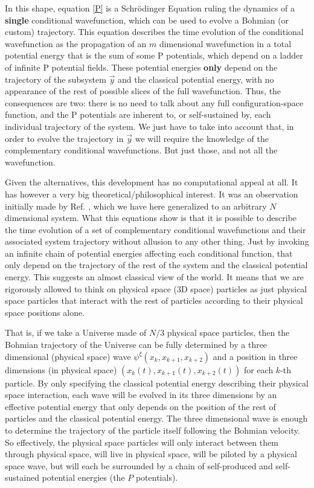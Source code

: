 \documentclass[11pt, a4paper]{article} %
\begin{document}
In this shape, equation \eqref{P} is a Schrödinger Equation ruling the dynamics of a {\bf single} conditional wavefunction, which can be used to evolve a Bohmian (or custom) trajectory. This equation describes the time evolution of the conditional wavefunction as the propagation of an $m$ dimensional wavefunction in a total potential energy that is the sum of some P potentials, which depend on a ladder of infinite P potential fields. These potential energies {\bf only} depend on the trajectory of the subsystem $\vec{y}$ and the classical potential energy, with no appearance of the rest of possible slices of the full wavefunction. Thus, the consequences are two: there is no need to talk about any full configuration-space function, and the P potentials are inherent to, or self-sustained by, each individual trajectory of the system. We just have to take into account that, in order to evolve the trajectory in $\vec{y}$ we will require the knowledge of the complementary conditional wavefunctions. But just those, and not all the wavefunction.

Given the alternatives, this development has no computational appeal at all. It has however a very big theoretical/philosophical interest. It was an observation initially made by Ref. \cite{Norsen}, which we have here generalized to an arbitrary $N$ dimensional system. What this equations show is that it is possible to describe the time evolution of a set of complementary conditional wavefunctions and their associated system trajectory without allusion to any other thing. Just by invoking an infinite chain of potential energies affecting each conditional function, that only depend on the trajectory of the rest of the system and the classical potential energy. This suggests an almost classical view of the world. It means that we are rigorously allowed to think on physical space (3D space) particles as just physical space particles that interact with the rest of particles according to their physical space positions alone. 

That is, if we take a Universe made of $N/3$ physical space particles, then the Bohmian trajectory of the Universe can be fully determined by a three dimensional (physical space) wave $\psi^\xi(x_k,x_{k+1},x_{k+2})$ and a position in three dimensions (in physical space) $(x_k(t),x_{k+1}(t),x_{k+2}(t))$ for each $k$-th particle. By only specifying the classical potential energy describing their physical space interaction, each wave will be evolved in its three dimensions by an effective potential energy that only depends on the position of the rest of particles and the classical potential energy. The three dimensional wave is enough to determine the trajectory of the particle itself following the Bohmian velocity. So effectively, the physical space particles will only interact between them through physical space, will live in physical space, will be piloted by a physical space wave, but will each be surrounded by a chain of self-produced and self-sustained potential energies (the $P$ potentials).
\end{document}
